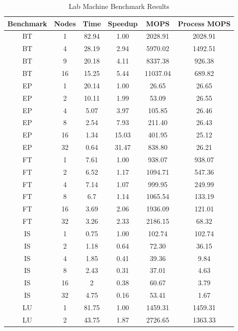 \documentclass{acm_proc_article-sp}
\begin{document}
\begin{table}[tbp]
\centering
\caption{Lab Machine Benchmark Results}
\label{LabTable}
\begin{tabular}{ c | c || c | c | c | c }
	Benchmark & Nodes & Time & Speedup & MOPS & Process MOPS\\ \hline
    BT    & 1     & 82.94 & 1.00     & 2028.91 & 2028.91 \\
    BT    & 4     & 28.19 & 2.94  & 5970.02 & 1492.51 \\
    BT    & 9     & 20.18 & 4.11  & 8337.38 & 926.38 \\
    BT    & 16    & 15.25 & 5.44  & 11037.04 & 689.82 \\
    EP    & 1     & 20.14 & 1.00     & 26.65 & 26.65 \\
    EP    & 2     & 10.11 & 1.99  & 53.09 & 26.55 \\
    EP    & 4     & 5.07  & 3.97  & 105.85 & 26.46 \\
    EP    & 8     & 2.54  & 7.93  & 211.40 & 26.43 \\
    EP    & 16    & 1.34  & 15.03 & 401.95 & 25.12 \\
    EP    & 32    & 0.64  & 31.47 & 838.80 & 26.21 \\
    FT    & 1     & 7.61  & 1.00     & 938.07 & 938.07 \\
    FT    & 2     & 6.52  & 1.17  & 1094.71 & 547.36 \\
    FT    & 4     & 7.14  & 1.07  & 999.95 & 249.99 \\
    FT    & 8     & 6.7   & 1.14  & 1065.54 & 133.19 \\
    FT    & 16    & 3.69  & 2.06  & 1936.09 & 121.01 \\
    FT    & 32    & 3.26  & 2.33  & 2186.15 & 68.32 \\
    IS    & 1     & 0.75  & 1.00     & 102.74 & 102.74 \\
    IS    & 2     & 1.18  & 0.64  & 72.30  & 36.15 \\
    IS    & 4     & 1.85  & 0.41  & 39.36 & 9.84 \\
    IS    & 8     & 2.43  & 0.31  & 37.01 & 4.63 \\
    IS    & 16    & 2     & 0.38  & 60.67 & 3.79 \\
    IS    & 32    & 4.75  & 0.16  & 53.41 & 1.67 \\
    LU    & 1     & 81.75 & 1.00     & 1459.31 & 1459.31 \\
    LU    & 2     & 43.75 & 1.87  & 2726.65 & 1363.33 \\

\end{tabular}
\end{table}
\end{document}
